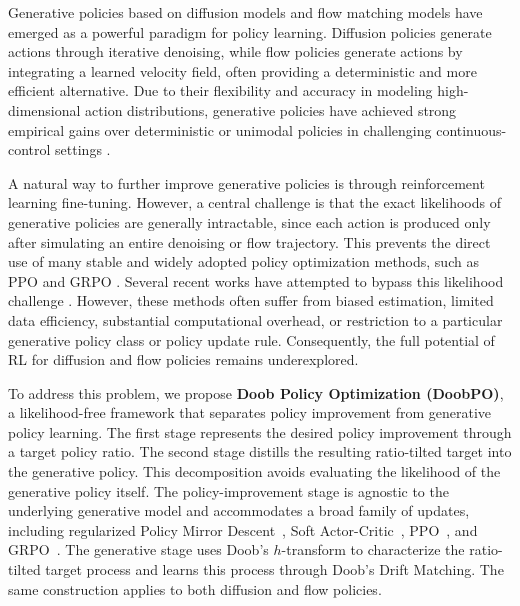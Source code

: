 
Generative policies based on diffusion models
\cite{song2019generative,song2020score,ho2020denoising}
and flow matching models
\cite{lipman2022flow,liu2022flow}
have emerged as a powerful paradigm for policy learning.
Diffusion policies generate actions through iterative denoising, while flow policies generate actions by integrating a learned velocity field, often providing a deterministic and more efficient alternative.
Due to their flexibility and accuracy in modeling high-dimensional action distributions, generative policies have achieved strong empirical gains over deterministic or unimodal policies in challenging continuous-control settings
\cite{ke20243d,chi2025diffusion,huang2024diffuseloco,black2024pi,intelligence2025pi}.

A natural way to further improve generative policies is through reinforcement learning fine-tuning.
However, a central challenge is that the exact likelihoods of generative policies are generally intractable, since each action is produced only after simulating an entire denoising or flow trajectory.
This prevents the direct use of many stable and widely adopted policy optimization methods, such as PPO
\cite{schulman2017proximal}
and GRPO
\cite{shao2024deepseekmath}.
Several recent works have attempted to bypass this likelihood challenge
\cite{psenka2023learning,ding2024diffusion,ma2025efficient,ren2024diffusion,zhang2025reinflow,mcallister2025flow}.
However, these methods often suffer from biased estimation, limited data efficiency, substantial computational overhead, or restriction to a particular generative policy class or policy update rule.
Consequently, the full potential of RL for diffusion and flow policies remains underexplored.

To address this problem, we propose \textbf{Doob Policy Optimization (DoobPO)}, a likelihood-free framework that separates policy improvement from generative policy learning.
The first stage represents the desired policy improvement through a target policy ratio.
The second stage distills the resulting ratio-tilted target into the generative policy.
This decomposition avoids evaluating the likelihood of the generative policy itself.
The policy-improvement stage is agnostic to the underlying generative model and accommodates a broad family of updates, including regularized Policy Mirror Descent~\cite{zhan2023policy}, Soft Actor-Critic~\cite{haarnoja2018soft}, PPO~\cite{schulman2017proximal}, and GRPO~\cite{shao2024deepseekmath}.
The generative stage uses Doob's $h$-transform to characterize the ratio-tilted target process and learns this process through Doob's Drift Matching.
The same construction applies to both diffusion and flow policies.

